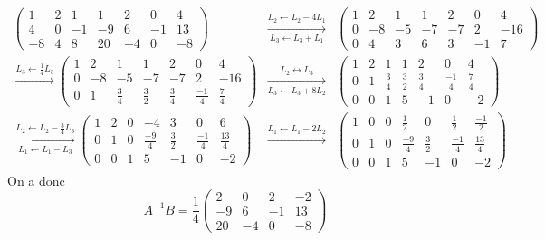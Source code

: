 \begin{eqnarray*}
  \left( \begin{array}{ccc|cccc}
    1 & 2 & 1 &    1 & 2 & 0 & 4 \\ 
    4 & 0 & -1 &   -9 & 6 & -1 & 13 \\
    -8 & 4 & 8 &   20 & -4 & 0 & -8
  \end{array}\right)
  &\xrightarrow[L_3 \leftarrow L_3 + L_1]{L_2 \leftarrow L_2 - 4 L_1}&
  \left( \begin{array}{ccc|cccc}
    1 & 2 & 1 &     1 & 2 & 0 & 4 \\ 
    0 & -8 & -5 &   -7 & -7 & 2 & -16 \\
    0 & 4 & 3 &     6 & 3 & -1 & 7
  \end{array}\right) \\
%
  \xrightarrow{L_3 \leftarrow \frac{1}{4} L_3}
  \left( \begin{array}{ccc|cccc}
    1 & 2 & 1 &             1 & 2 & 0 & 4 \\ 
    0 & -8 & -5 &           -7 & -7 & 2 & -16 \\
    0 & 1 & \frac{3}{4} &   \frac{3}{2} & \frac{3}{4} & \frac{-1}{4} & \frac{7}{4}
  \end{array}\right)
  &\xrightarrow[L_3 \leftarrow L_3 + 8 L_2]{L_2 \leftrightarrow L_3}&
  \left( \begin{array}{ccc|cccc}
    1 & 2 & 1 &             1 & 2 & 0 & 4 \\ 
    0 & 1 & \frac{3}{4} &   \frac{3}{2} & \frac{3}{4} & \frac{-1}{4} & \frac{7}{4} \\
    0 & 0 & 1 &             5 & -1 & 0 & -2
  \end{array}\right) \\
%
  \xrightarrow[L_1 \leftarrow L_1 - L_3]{L_2 \leftarrow L_2 - \frac{3}{4} L_3}
  \left( \begin{array}{ccc|cccc}
    1 & 2 & 0 &   -4 & 3 & 0 & 6 \\ 
    0 & 1 & 0 &   \frac{-9}{4} & \frac{3}{2} & \frac{-1}{4} & \frac{13}{4} \\
    0 & 0 & 1 &   5 & -1 & 0  & -2
  \end{array}\right)
  &\xrightarrow{L_1 \leftarrow L_1 - 2L_2}&
  \left( \begin{array}{ccc|cccc}
    1 & 0 & 0 &  	\frac{1}{2} & 0 & \frac{1}{2} & \frac{-1}{2} \\ 
    0 & 1 & 0 &   \frac{-9}{4} & \frac{3}{2} & \frac{-1}{4} & \frac{13}{4} \\
    0 & 0 & 1 &   5 & -1 & 0 & -2
  \end{array}\right)
\end{eqnarray*}
On a donc
$$A^{-1} B = \frac{1}{4} \begin{pmatrix} 
  2 & 0 & 2 & -2 \\ 
  -9 & 6 & -1 & 13 \\ 
  20 & -4 & 0 & -8 
\end{pmatrix}$$


